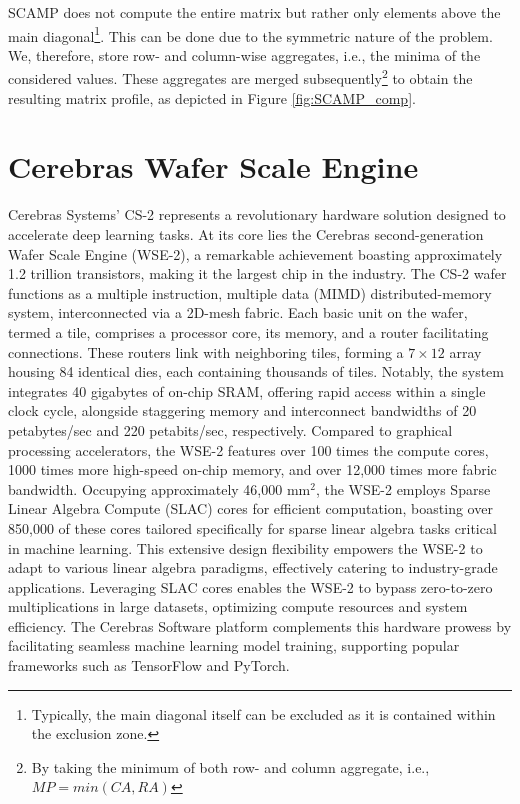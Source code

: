 SCAMP does not compute the entire matrix but rather only elements above the main
diagonal\footnote{Typically, the main diagonal itself can be excluded as it is contained within the exclusion zone.}. This can be done due to the symmetric nature of the problem. We, therefore,
store row- and column-wise aggregates, i.e., the minima of the considered values. These
aggregates are merged subsequently\footnote{By taking the minimum of both row- and column aggregate, i.e., $MP = min(CA , RA )$} to obtain the resulting matrix profile, as depicted
in Figure \ref{fig:SCAMP_comp}.

\section{Cerebras Wafer Scale Engine} \label{section:wse}

Cerebras Systems' CS-2 represents a revolutionary hardware solution designed to accelerate deep learning tasks. At its core lies the Cerebras second-generation Wafer Scale Engine (WSE-2), a remarkable achievement boasting approximately 1.2 trillion transistors, making it the largest chip in the industry. The CS-2 wafer functions as a multiple instruction, multiple data (MIMD) distributed-memory system, interconnected via a 2D-mesh fabric. Each basic unit on the wafer, termed a tile, comprises a processor core, its memory, and a router facilitating connections. These routers link with neighboring tiles, forming a $7 \times 12$ array housing 84 identical dies, each containing thousands of tiles. Notably, the system integrates 40 gigabytes of on-chip SRAM, offering rapid access within a single clock cycle, alongside staggering memory and interconnect bandwidths of 20 petabytes/sec and 220 petabits/sec, respectively. Compared to graphical processing accelerators, the WSE-2 features over 100 times the compute cores, 1000 times more high-speed on-chip memory, and over 12,000 times more fabric bandwidth. Occupying approximately 46,000 mm$^2$, the WSE-2 employs Sparse Linear Algebra Compute (SLAC) cores for efficient computation, boasting over 850,000 of these cores tailored specifically for sparse linear algebra tasks critical in machine learning. This extensive design flexibility empowers the WSE-2 to adapt to various linear algebra paradigms, effectively catering to industry-grade applications. Leveraging SLAC cores enables the WSE-2 to bypass zero-to-zero multiplications in large datasets, optimizing compute resources and system efficiency. The Cerebras Software platform complements this hardware prowess by facilitating seamless machine learning model training, supporting popular frameworks such as TensorFlow and PyTorch.

